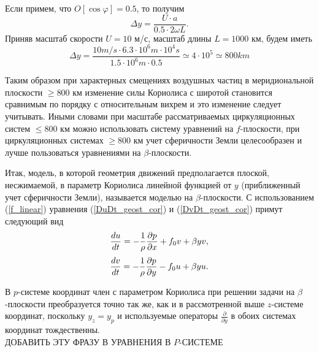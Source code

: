    Если примем, что $O[\cos\varphi]=0.5$, то получим
   \[
   \Delta y = \frac{U \cdot a}{0.5 \cdot 2\omega L}.
   \]
   Приняв масштаб скорости $U=10$ м/с, масштаб длины $L=1000$ км, будем иметь
   \[
   \Delta y = \frac{10 m/s \cdot 6.3 \cdot 10^6 m \cdot 10^4 s}{1.5 \cdot 10^6 m \cdot 0.5} \simeq 4 \cdot 10^5 \simeq 800 km 
   \]
   
   Таким образом при характерных смещениях воздушных частиц в меридиональной плоскости $\geq800$ км изменение силы Кориолиса с широтой становится сравнимым по порядку с относительным вихрем и это изменение следует учитывать. Иными словами при масштабе рассматриваемых циркуляционных систем $\leq800$ км можно использовать систему уравнений на $f$-плоскости, при циркуляционных системах  $\geq800$ км учет сферичности Земли целесообразен и лучше пользоваться уравнениями на $\beta$-плоскости.
   
   Итак, модель, в которой геометрия движений предполагается плоской, несжимаемой, в параметр Кориолиса линейной функцией от $y$ (приближенный учет сферичности Земли), называется моделью на $\beta$-плоскости. С использованием (\ref{f_linear}) уравнения (\ref{DuDt_geost_cor}) и (\ref{DvDt_geost_cor}) примут следующий вид
    \begin{equation}
        \displaystyle\frac{d u}{d t} = -\frac{1}{\rho}\displaystyle\frac{\partial p}{\partial x}+f_0 v+\beta y v, 
    \end{equation} 
    \begin{equation}
        \displaystyle\frac{d v}{d t} = -\frac{1}{\rho}\displaystyle\frac{\partial p}{\partial y}-f_0 u+\beta y u. 
    \end{equation} 
    \begin{warn}
        В $p$-системе координат член с параметром Кориолиса при решении задачи на $\beta$-плоскости преобразуется точно так же, как и в рассмотренной выше $z$-системе координат, поскольку $y_z=y_p$ и используемые операторы $\frac{\partial}{\partial y}$ в обоих системах координат тождественны.\\
        ДОБАВИТЬ ЭТУ ФРАЗУ В УРАВНЕНИЯ В $P$-СИСТЕМЕ
    \end{warn}

